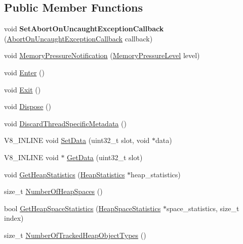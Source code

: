 \subsection*{Public Member Functions}
\begin{DoxyCompactItemize}
\item 
void {\bfseries Set\+Abort\+On\+Uncaught\+Exception\+Callback} (\hyperlink{classv8_1_1_isolate_aeb1d49e500d9521b42743a6a740271e2}{Abort\+On\+Uncaught\+Exception\+Callback} callback)\hypertarget{classv8_1_1_isolate_afb7aad57eec61464b5a7c3816bae60be}{}\label{classv8_1_1_isolate_afb7aad57eec61464b5a7c3816bae60be}

\item 
void \hyperlink{classv8_1_1_isolate_ae1b8d5696ba55dd3412989811c44c373}{Memory\+Pressure\+Notification} (\hyperlink{namespacev8_ae0e9a25bf51e518585f555806e7dc7b9}{Memory\+Pressure\+Level} level)
\item 
void \hyperlink{classv8_1_1_isolate_aec80bb49b6b7647ff75e8f2cc9484ea3}{Enter} ()
\item 
void \hyperlink{classv8_1_1_isolate_a64a8503cafd00d1d2cadfbb0c2345054}{Exit} ()
\item 
void \hyperlink{classv8_1_1_isolate_a1a5a5762e4221aff8c6b10f9e3cec0af}{Dispose} ()
\item 
void \hyperlink{classv8_1_1_isolate_ac62ff53be40f5ecd74fc9e72451da115}{Discard\+Thread\+Specific\+Metadata} ()
\item 
V8\+\_\+\+I\+N\+L\+I\+NE void \hyperlink{classv8_1_1_isolate_a2ae968a7ff8a397f1ac09d32990883f6}{Set\+Data} (uint32\+\_\+t slot, void $\ast$data)
\item 
V8\+\_\+\+I\+N\+L\+I\+NE void $\ast$ \hyperlink{classv8_1_1_isolate_aed85b3c82bf69a60ecebc2558ab95083}{Get\+Data} (uint32\+\_\+t slot)
\item 
void \hyperlink{classv8_1_1_isolate_add32e78544edaf8946ed9b328167e5e4}{Get\+Heap\+Statistics} (\hyperlink{classv8_1_1_heap_statistics}{Heap\+Statistics} $\ast$heap\+\_\+statistics)
\item 
size\+\_\+t \hyperlink{classv8_1_1_isolate_ad948acf0892e677a95fbc743b63ca5fa}{Number\+Of\+Heap\+Spaces} ()
\item 
bool \hyperlink{classv8_1_1_isolate_a28ab96294ee07064cbba01e969b62cbc}{Get\+Heap\+Space\+Statistics} (\hyperlink{classv8_1_1_heap_space_statistics}{Heap\+Space\+Statistics} $\ast$space\+\_\+statistics, size\+\_\+t index)
\item 
size\+\_\+t \hyperlink{classv8_1_1_isolate_a170044cddf655345682cb3c9b4bd1788}{Number\+Of\+Tracked\+Heap\+Object\+Types} ()

\end{DoxyCompactItemize}
